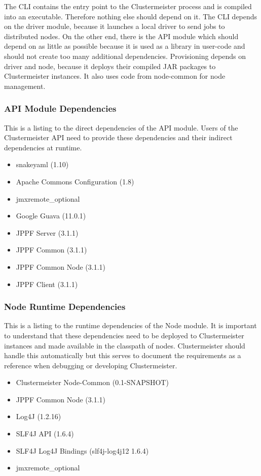 \documentclass[12pt]{article}
\begin{document}
The CLI contains the entry point to the Clustermeister process and is compiled into an executable. Therefore nothing else should depend on it. The CLI depends on the driver module, because it launches a local driver to send jobs to distributed nodes. On the other end, there is the API module which should depend on as little as possible because it is used as a library in user-code and should not create too many additional dependencies. Provisioning depends on driver and node, because it deploys their compiled JAR packages to Clustermeister instances. It also uses code from node-common for node management.

\subsubsection{API Module Dependencies}
This is a listing to the direct dependencies of the API module. Users of the Clustermeister API need to provide these dependencies and their indirect dependencies at runtime.

\begin{itemize}
 \item snakeyaml (1.10)
 \item Apache Commons Configuration (1.8)
 \item jmxremote\_optional
 \item Google Guava (11.0.1)
 \item JPPF Server (3.1.1)
 \item JPPF Common (3.1.1)
 \item JPPF Common Node (3.1.1)
 \item JPPF Client (3.1.1)
\end{itemize} 

\subsubsection{Node Runtime Dependencies}
This is a listing to the runtime dependencies of the Node module. It is important to understand that these dependencies need to be deployed to Clustermeister instances and made available in the classpath of nodes. Clustermeister should handle this automatically but this serves to document the requirements as a reference when debugging or developing Clustermeister.

\begin{itemize}
 \item Clustermeister Node-Common (0.1-SNAPSHOT)
 \item JPPF Common Node (3.1.1)
 \item Log4J (1.2.16)
 \item SLF4J API (1.6.4)
 \item SLF4J Log4J Bindings (slf4j-log4j12 1.6.4)
 \item jmxremote\_optional
\end{itemize}
\end{document}
